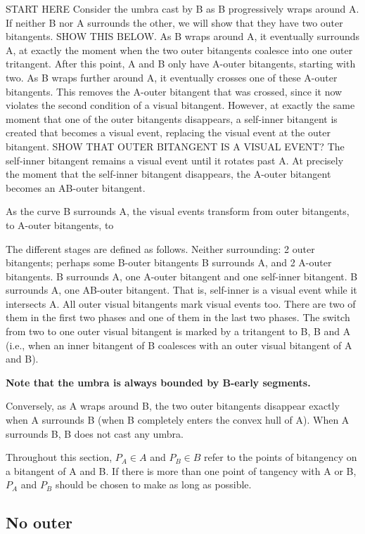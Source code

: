 \documentclass[12pt]{article}
\begin{document}
START HERE
Consider the umbra cast by B as B progressively wraps around A.
If neither B nor A surrounds the other, we will show that they have two outer bitangents.
SHOW THIS BELOW.
As B wraps around A, it eventually surrounds A, at exactly the moment when the two
outer bitangents coalesce into one outer tritangent.
After this point, A and B only have A-outer bitangents, starting with two.
As B wraps further around A, it eventually crosses one of these A-outer bitangents.
This removes the A-outer bitangent that was crossed, 
since it now violates the second condition of a visual bitangent.
However, at exactly the same moment that one of the outer bitangents disappears, 
a self-inner bitangent is created that becomes a visual event,
replacing the visual event at the outer bitangent.
SHOW THAT OUTER BITANGENT IS A VISUAL EVENT?
The self-inner bitangent remains a visual event until it rotates past A.
At precisely the moment that the self-inner bitangent disappears, 
the A-outer bitangent becomes an AB-outer bitangent.

As the curve B surrounds A, the visual events transform from outer bitangents, to
A-outer bitangents, to 

The different stages are defined as follows.
Neither surrounding: 2 outer bitangents; perhaps some B-outer bitangents
B surrounds A, and 2 A-outer bitangents.
B surrounds A, one A-outer bitangent and one self-inner bitangent.
B surrounds A, one AB-outer bitangent.
That is, self-inner is a visual event while it intersects A.
All outer visual bitangents mark visual events too.
There are two of them in the first two phases and one of them in the last two phases.
The switch from two to one outer visual bitangent is marked by a tritangent to
B, B and A (i.e., when an inner bitangent of B coalesces with an outer visual bitangent
of A and B).

{\bf Note that the umbra is always bounded by B-early segments.}

Conversely, as A wraps around B, the two outer bitangents disappear exactly 
when A surrounds B (when B completely enters the convex hull of A).
When A surrounds B, B does not cast any umbra.

Throughout this section, $P_A \in A$ and $P_B \in B$ refer to the points of 
bitangency on a bitangent of A and B.
If there is more than one point of tangency with A or B,
$P_A$ and $P_B$ should be chosen to make  as long as possible.

\clearpage

\subsection{No outer}
\end{document}
